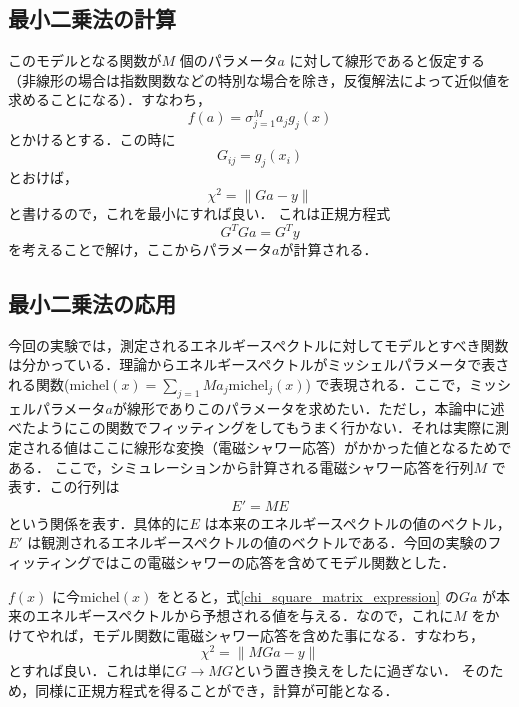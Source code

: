 \subsection{最小二乗法の計算}
このモデルとなる関数が$M$ 個のパラメータ$a$ に対して線形であると仮定する （非線形の場合は指数関数などの特別な場合を除き，反復解法によって近似値を求めることになる）．すなわち，
\begin{equation}
f(a) = \sigma_{j=1}^M a_j g_j(x)
\end{equation}
とかけるとする．この時に
\begin{equation}
G_{ij} = g_j(x_i)
\end{equation}
とおけば，
\begin{equation}
\chi^2 = \| Ga - y \|
\label{chi_square_matrix_expression}
\end{equation}
と書けるので，これを最小にすれば良い．
これは正規方程式
\begin{equation}
G^TGa=G^Ty
\end{equation}
を考えることで解け，ここからパラメータ$a$が計算される．

\subsection{最小二乗法の応用}
今回の実験では，測定されるエネルギースペクトルに対してモデルとすべき関数は分かっている．理論からエネルギースペクトルがミッシェルパラメータで表される関数($\mathrm{michel}(x) = \sum_{j=1}{M}a_j \mathrm{michel}_j(x)$) で表現される．ここで，ミッシェルパラメータ$a$が線形でありこのパラメータを求めたい．ただし，本論中に述べたようにこの関数でフィッティングをしてもうまく行かない．それは実際に測定される値はここに線形な変換（電磁シャワー応答）がかかった値となるためである．
ここで，シミュレーションから計算される電磁シャワー応答を行列$M$ で表す．この行列は
\begin{eqnarray}
E' = ME
\end{eqnarray}
という関係を表す．具体的に$E$ は本来のエネルギースペクトルの値のベクトル，$E'$ は観測されるエネルギースペクトルの値のベクトルである．今回の実験のフィッティングではこの電磁シャワーの応答を含めてモデル関数とした．

$f(x)$ に今$\mathrm{michel}(x)$ をとると，式\eqref{chi_square_matrix_expression} の$Ga$ が本来のエネルギースペクトルから予想される値を与える．なので，これに$M$ をかけてやれば，モデル関数に電磁シャワー応答を含めた事になる．すなわち，
\begin{equation}
\chi^2 = \| MGa - y \|
\end{equation}
とすれば良い．これは単に$G\rightarrow MG$という置き換えをしたに過ぎない．
そのため，同様に正規方程式を得ることができ，計算が可能となる．
